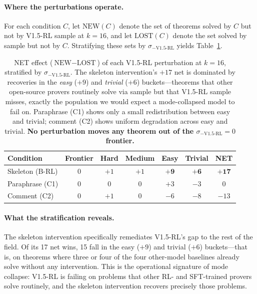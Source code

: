 \documentclass{article}
\begin{document}
\paragraph{Where the perturbations operate.}
For each condition $C$, let $\text{NEW}(C)$ denote the set of theorems solved by $C$ but not by V1.5-RL sample at $k{=}16$, and let $\text{LOST}(C)$ denote the set solved by sample but not by $C$. Stratifying these sets by $\sigma_{-\text{V1.5-RL}}$ yields Table~\ref{tab:bucket_strat}.

\begin{table}[t]
\centering
\small
\begin{tabular}{lcccccc}
\toprule
\textbf{Condition} & \textbf{Frontier} & \textbf{Hard} & \textbf{Medium} & \textbf{Easy} & \textbf{Trivial} & \textbf{NET} \\
\midrule
Skeleton (B-RL) & 0 & $+1$ & $+1$  & $\mathbf{+9}$  & $\mathbf{+6}$  & $\mathbf{+17}$ \\
Paraphrase (C1) & 0 & 0    & 0     & $+3$           & $-3$           & 0              \\
Comment (C2)    & 0 & $+1$ & 0     & $-6$           & $-8$           & $-13$          \\
\bottomrule
\end{tabular}
\caption{NET effect ($\text{NEW}-\text{LOST}$) of each V1.5-RL perturbation at $k{=}16$, stratified by $\sigma_{-\text{V1.5-RL}}$. The skeleton intervention's $+17$ net is dominated by recoveries in the \emph{easy} ($+9$) and \emph{trivial} ($+6$) buckets---theorems that other open-source provers routinely solve via sample but that V1.5-RL sample misses, exactly the population we would expect a mode-collapsed model to fail on. Paraphrase (C1) shows only a small redistribution between easy and trivial; comment (C2) shows uniform degradation across easy and trivial. \textbf{No perturbation moves any theorem out of the $\sigma_{-\text{V1.5-RL}}{=}0$ frontier.}}
\label{tab:bucket_strat}
\end{table}

\paragraph{What the stratification reveals.}
The skeleton intervention specifically remediates V1.5-RL's gap to the rest of the field. Of its 17 net wins, 15 fall in the easy ($+9$) and trivial ($+6$) buckets---that is, on theorems where three or four of the four other-model baselines already solve without any intervention. This is the operational signature of mode collapse: V1.5-RL is failing on problems that other RL- and SFT-trained provers solve routinely, and the skeleton intervention recovers precisely those problems.
\end{document}
